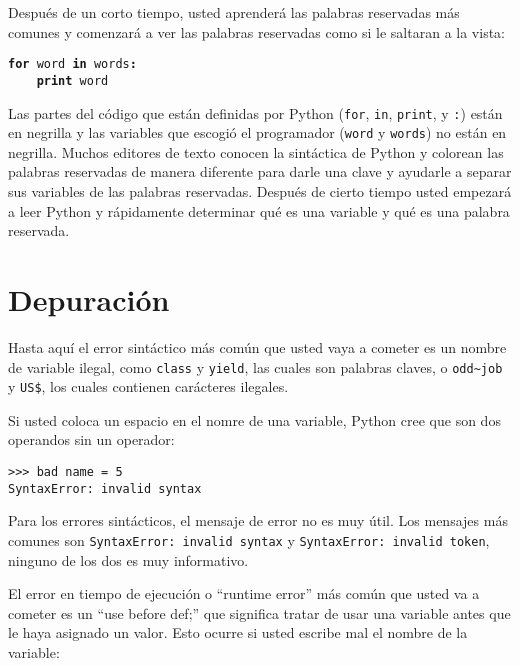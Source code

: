 \begin{ex}
Despu\'es de un corto tiempo, usted aprender\'a las palabras reservadas m\'as comunes y comenzar\'a a ver las palabras reservadas como si le saltaran a la vista:

{\tt {\bf for} word {\bf in} words{\bf :}\\
\verb"    "{\bf print} word }

Las partes del c\'odigo que est\'an definidas por Python ({\tt for}, {\tt in}, {\tt print}, y {\tt :}) est\'an en negrilla y las variables que escogi\'o el programador ({\tt word} y {\tt words}) no est\'an en negrilla.  
Muchos editores de texto conocen la sint\'actica de Python
y colorean las palabras reservadas de manera diferente para darle una clave y ayudarle a separar sus variables de las palabras reservadas.
Despu\'es de cierto tiempo usted empezar\'a a leer Python y r\'apidamente determinar qu\'e es una variable y qu\'e es una palabra reservada.

\section{Depuraci\'on}

Hasta aqu\'i el error sint\'actico m\'as com\'un que usted vaya a cometer es un nombre de variable ilegal, como {\tt class} y {\tt yield}, las cuales son palabras claves, o \verb"odd~job" y \verb"US$", los cuales contienen car\'acteres ilegales.


Si usted coloca un espacio en el nomre de una variable, Python cree que son dos 
operandos sin un operador:

\beforeverb
\begin{verbatim}
>>> bad name = 5
SyntaxError: invalid syntax
\end{verbatim}
\afterverb
%
Para los errores sint\'acticos, el mensaje de error no es muy \'util.
Los mensajes m\'as comunes son {\tt SyntaxError: invalid syntax} y
{\tt SyntaxError: invalid token}, ninguno de los dos es muy informativo.


El error en tiempo de ejecuci\'on o ``runtime error'' m\'as com\'un que usted va a cometer es un ``use before
def;'' que significa tratar de usar una variable antes que le haya asignado
un valor. Esto ocurre si usted escribe mal el nombre de la variable:


\end{ex}
